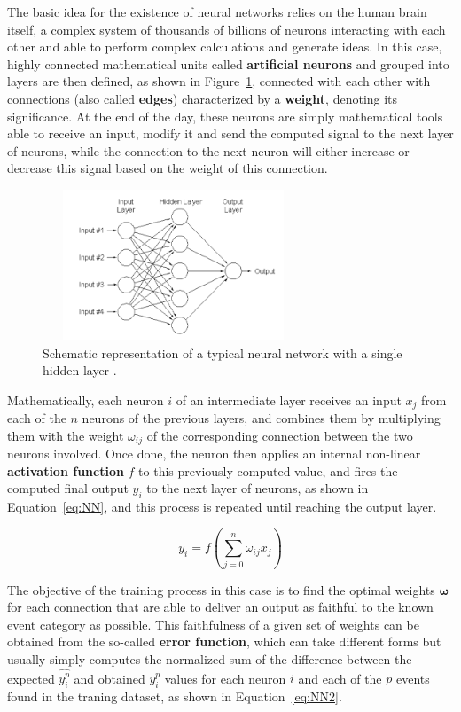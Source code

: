 \documentclass[a4paper, 10pt, openright]{report}
\begin{document}
The basic idea for the existence of neural networks relies on the human brain itself, a complex system of thousands of billions of neurons interacting with each other and able to perform complex calculations and generate ideas. In this case, highly connected mathematical units called \textbf{artificial neurons} and grouped into layers are then defined, as shown in Figure~\ref{fig:NN}, connected with each other with connections (also called \textbf{edges}) characterized by a \textbf{weight}, denoting its significance. At the end of the day, these neurons are simply mathematical tools able to receive an input, modify it and send the computed signal to the next layer of neurons, while the connection to the next neuron will either increase or decrease this signal based on the weight of this connection.

\begin{figure}[htbp]
\centering
\includegraphics[width=7.8cm, height=4.5cm]{figs/NN.png}
\caption{Schematic representation of a typical neural network with a single hidden layer \cite{NN}.}
\label{fig:NN}
\end{figure}

Mathematically, each neuron $i$ of an intermediate layer receives an input $x_{j}$ from each of the $n$ neurons of the previous layers, and combines them by multiplying them with the weight $\omega_{ij}$ of the corresponding connection between the two neurons involved. Once done, the neuron then applies an internal non-linear \textbf{activation function} $f$ to this previously computed value, and fires the computed final output $y_i$ to the next layer of neurons, as shown in Equation~\ref{eq:NN}, and this process is repeated until reaching the output layer.

\begin{equation}
\label{eq:NN}
y_i = f \left (\sum_{j = 0}^n \omega_{ij} x_j \right)
\end{equation}

The objective of the training process in this case is to find the optimal weights $\bm \omega$ for each connection that are able to deliver an output as faithful to the known event category as possible. This faithfulness of a given set of weights can be obtained from the so-called \textbf{error function}, which can take different forms but usually simply computes the normalized sum of the difference between the expected $\hat{y_i^p}$ and obtained $y_i^p$ values for each neuron $i$ and each of the $p$ events found in the traning dataset, as shown in Equation~\ref{eq:NN2}.
\end{document}
